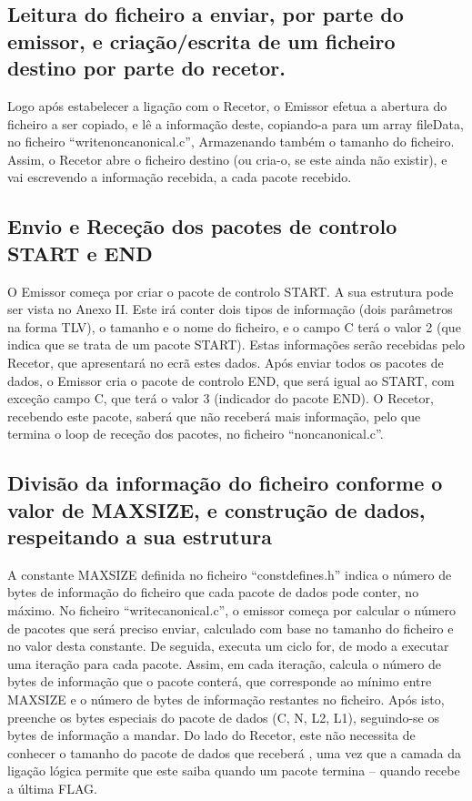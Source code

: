 \documentclass[article, a4paper, 11pt, oneside]{memoir}
\begin{document}
\subsection{Leitura do ficheiro a enviar, por parte do emissor, e criação/escrita de um ficheiro destino por parte do recetor.} 

Logo após estabelecer a ligação com o Recetor, o Emissor efetua a abertura do ficheiro a ser copiado, e lê a informação deste,
copiando-a para um array fileData, no ficheiro “writenoncanonical.c”, Armazenando também o 
tamanho do ficheiro. Assim, o Recetor abre o ficheiro destino (ou cria-o, se este ainda não existir), e vai escrevendo a informação recebida, a cada pacote recebido.

\subsection{Envio e Receção dos pacotes de controlo START e END}
O Emissor começa por criar o pacote de controlo START. A sua estrutura pode ser vista no Anexo II. Este irá conter dois tipos de informação (dois parâmetros na forma TLV), 
o tamanho e o nome do ficheiro,
 e o campo C terá o valor 2 (que indica que se trata de um pacote START). 
Estas informações serão recebidas pelo Recetor, que apresentará no ecrã estes dados.
Após enviar todos os pacotes de dados, o Emissor cria o pacote de controlo END, que será igual ao START, com exceção 
 campo C, que terá o valor 3 (indicador do pacote END). 
O Recetor, recebendo este pacote, saberá que não receberá mais informação, pelo que termina o loop de receção dos
 pacotes, no ficheiro “noncanonical.c”.

\subsection{Divisão da informação do ficheiro conforme o valor de MAX\textunderscore SIZE, e construção de dados, respeitando a 
sua estrutura}

A constante MAX\textunderscore SIZE definida no ficheiro “constdefines.h” indica o número de bytes de informação do
ficheiro que cada pacote de dados pode conter, no máximo.
No ficheiro “writecanonical.c”, o emissor começa por calcular o número de pacotes que será preciso enviar, 
calculado com base no tamanho do ficheiro e no valor desta constante. De seguida, executa um ciclo for, de modo 
a executar uma iteração para cada pacote.
Assim, em cada iteração, calcula o número de bytes de informação que o pacote conterá, que corresponde ao 
mínimo entre MAX\textunderscore SIZE e o número de bytes de informação 
restantes no ficheiro. Após isto, preenche os bytes especiais do pacote de dados (C, N, L2, L1), seguindo-se 
os bytes de informação a mandar. Do lado do Recetor, 
este não necessita de conhecer o tamanho do pacote de dados que receberá , uma vez que a camada da ligação 
lógica permite que este saiba quando um pacote termina – quando recebe a última FLAG.
\end{document}
